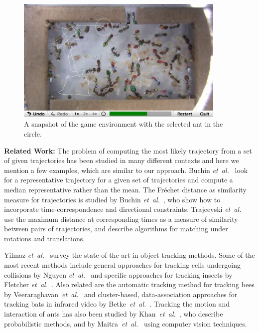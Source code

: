 \documentclass{llncs}
\newcommand{\Frechet}[0]{Fr\'{e}chet}
\begin{document}
\begin{figure}[tb]
\centering
\includegraphics[height=6cm]{pic/screenshot2.png}
\caption{\small A snapshot of the game environment with the selected ant in the circle.}
\label{fig:antcolony}
\end{figure}


{\bf Related Work:}
The problem of computing the most likely trajectory from a set of given trajectories has been studied in many different contexts and here we mention a few examples, which are similar to our approach.
Buchin {\em et~al.}~\cite{bbklsww-mt-10} look for
a representative trajectory for a given set of trajectories and
compute a median representative rather than the mean.
The \Frechet{} distance as similarity measure for
trajectories is studied by Buchin {\em et~al.}~\cite{DBLP:journals/gis/BuchinBG10}, who show how to
incorporate time-correspondence and directional constraints.
Trajcevski {\em et~al.}~\cite{DBLP:conf/gis/TrajcevskiDSTV07} use the
maximum distance at corresponding times as a measure of similarity between
pairs of trajectories, and describe algorithms for %
matching under rotations and translations.

Yilmaz {\em et~al.}~\cite{Yilmaz:2006:OTS:1177352.1177355} survey
the state-of-the-art in object tracking methods. Some of the most
recent methods include general approaches for tracking
cells undergoing collisions by Nguyen {\em et~al.}~\cite{5779709} and
specific approaches for tracking insects by
Fletcher {\em et~al.}~\cite{5711555}.
Also related are the automatic tracking
method for tracking bees by Veeraraghavan~{\em et~al.}~\cite{10.1109/TPAMI.2007.70707}
and cluster-based, data-association
approaches for tracking bats in infrared video by
Betke~{\em et~al.}~\cite{4270019}. Tracking the motion and interaction
of ants has also been studied by
Khan~{\em et~al.}~\cite{1512059}, who describe probabilistic
methods, and by Maitra~{\em et~al.}~\cite{5403051} using
computer vision techniques.
\end{document}
